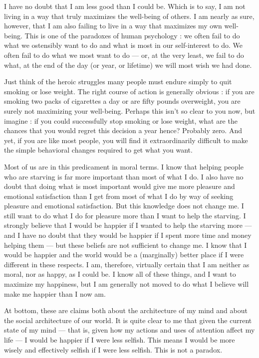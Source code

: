 \documentclass[a4paper,14pt]{extarticle}
\begin{document}
I have no doubt that I am less good than I could be.
Which is to say, I am not living in a way that truly maximizes the well-being of others.
I am nearly as sure, however, that I am also failing to live in a way that maximizes my own well-being.
This is one of the paradoxes of human psychology :
we often fail to do what we ostensibly want to do and what is most in our self-interest to do.
We often fail to do what we most want to do --- or, at the very least, we fail to do what, at the end of the day (or year, or lifetime) we will most wish we had done.

Just think of the heroic struggles many people must endure simply to quit smoking or lose weight.
The right course of action is generally obvious : if you are smoking two packs of cigarettes a day or are fifty pounds overweight, you are surely not maximizing your well-being.
Perhaps this isn't so clear to you now, but imagine : if you could successfully stop smoking or lose weight, what are the chances that you would regret this decision a year hence?
Probably zero.
And yet, if you are like most people, you will find it extraordinarily difficult to make the simple behavioral changes required to get what you want.

Most of us are in this predicament in moral terms.
I know that helping people who are starving is far more important than most of what I do.
I also have no doubt that doing what is most important would give me more pleasure and emotional satisfaction than I get from most of what I do by way of seeking pleasure and emotional satisfaction.
But this knowledge does not change me.
I still want to do what I do for pleasure more than I want to help the starving.
I strongly believe that I would be happier if I wanted to help the starving more --- and I have no doubt that they would be happier if I spent more time and money helping them --- but these beliefs are not sufficient to change me.
I know that I would be happier and the world would be a (marginally) better place if I were different in these respects.
I am, therefore, virtually certain that I am neither as moral, nor as happy, as I could be.
I know all of these things, and I want to maximize my happiness, but I am generally not moved to do what I believe will make me happier than I now am.

At bottom, these are claims both about the architecture of my mind and about the social architecture of our world.
It is quite clear to me that given the current state of my mind --- that is, given how my actions and uses of attention affect my life --- I would be happier if I were less selfish.
This means I would be more wisely and effectively selfish if I were less selfish.
This is not a paradox.
\end{document}
